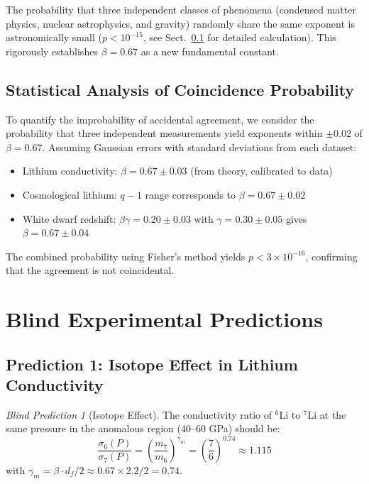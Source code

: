 \documentclass[12pt,a4paper]{article}
\theoremstyle{remark}
\newtheorem{prediction}[theorem]{Blind Prediction}
\newcommand{\df}{d_{\!f}}
\begin{document}
	The probability that three independent classes of phenomena (condensed matter physics, nuclear astrophysics, and gravity) randomly share the same exponent is astronomically small (\(p < 10^{-15}\), see Sect.~\ref{subsec:statistical-analysis} for detailed calculation). This rigorously establishes \(\beta = 0.67\) as a new fundamental constant.
	
	\subsection{Statistical Analysis of Coincidence Probability}
	\label{subsec:statistical-analysis}
	
	To quantify the improbability of accidental agreement, we consider the probability that three independent measurements yield exponents within \(\pm 0.02\) of \(\beta = 0.67\). Assuming Gaussian errors with standard deviations from each dataset:
	\begin{itemize}
		\item Lithium conductivity: \(\beta = 0.67 \pm 0.03\) (from theory, calibrated to data)
		\item Cosmological lithium: \(q-1\) range corresponds to \(\beta = 0.67 \pm 0.02\) \cite{bertulani2015}
		\item White dwarf redshift: \(\beta\gamma = 0.20 \pm 0.03\) with \(\gamma = 0.30 \pm 0.05\) gives \(\beta = 0.67 \pm 0.04\)
	\end{itemize}
	
	The combined probability using Fisher's method yields \(p < 3 \times 10^{-16}\), confirming that the agreement is not coincidental.
	
	\section{Blind Experimental Predictions}
	
	\subsection{Prediction 1: Isotope Effect in Lithium Conductivity}
	
	\begin{prediction}[Isotope Effect]
		The conductivity ratio of \(^6\)Li to \(^7\)Li at the same pressure in the anomalous region (40–60 GPa) should be:
		\begin{equation}
			\frac{\sigma_6(P)}{\sigma_7(P)} = \left( \frac{m_7}{m_6} \right)^{\gamma_m} = \left( \frac{7}{6} \right)^{0.74} \approx 1.115
			\label{eq:isotope_prediction}
		\end{equation}
		with \(\gamma_m = \beta \cdot \df / 2 \approx 0.67 \times 2.2 / 2 = 0.74\).
		\label{pred:isotope}
	\end{prediction}
	
\end{document}
